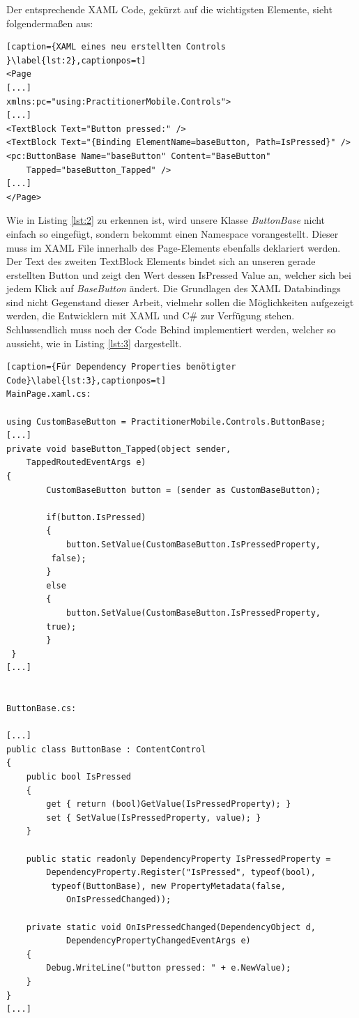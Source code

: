 \documentclass[a4paper,bibtotoc,oneside]{scrbook}
\begin{document}
\newline
Der entsprechende XAML Code, gekürzt auf die wichtigsten Elemente, sieht folgendermaßen aus:
\newline
\begin{lstlisting}[caption={XAML eines neu erstellten Controls }\label{lst:2},captionpos=t]
<Page
[...]
xmlns:pc="using:PractitionerMobile.Controls">
[...]
<TextBlock Text="Button pressed:" />
<TextBlock Text="{Binding ElementName=baseButton, Path=IsPressed}" />
<pc:ButtonBase Name="baseButton" Content="BaseButton" 
	Tapped="baseButton_Tapped" />
[...]
</Page>
\end{lstlisting}
Wie in Listing \ref{lst:2} zu erkennen ist, wird unsere Klasse \textit{ButtonBase} nicht einfach so eingefügt, sondern bekommt einen Namespace vorangestellt. Dieser muss im XAML File innerhalb des Page-Elements ebenfalls deklariert werden.
\newline
\newline
Der Text des zweiten TextBlock Elements bindet sich an unseren gerade erstellten Button und zeigt den Wert dessen IsPressed Value an, welcher sich bei jedem Klick auf \textit{BaseButton} ändert. Die Grundlagen des XAML Databindings sind nicht Gegenstand dieser Arbeit, vielmehr sollen die Möglichkeiten aufgezeigt werden, die Entwicklern mit XAML und C\# zur Verfügung stehen.
\newline
\newline
Schlussendlich muss noch der Code Behind implementiert werden, welcher so aussieht, wie in Listing \ref{lst:3} dargestellt.
\begin{lstlisting}[caption={Für Dependency Properties benötigter Code}\label{lst:3},captionpos=t]
MainPage.xaml.cs:

using CustomBaseButton = PractitionerMobile.Controls.ButtonBase;
[...]
private void baseButton_Tapped(object sender,
	TappedRoutedEventArgs e)
{
        CustomBaseButton button = (sender as CustomBaseButton);

        if(button.IsPressed)
        {
            button.SetValue(CustomBaseButton.IsPressedProperty,
		 false);
        }
        else
        {
            button.SetValue(CustomBaseButton.IsPressedProperty, 
		true);
        }
 }
[...]


ButtonBase.cs:

[...]
public class ButtonBase : ContentControl
{
    public bool IsPressed
    {
        get { return (bool)GetValue(IsPressedProperty); }
        set { SetValue(IsPressedProperty, value); }
    }

    public static readonly DependencyProperty IsPressedProperty = 
        DependencyProperty.Register("IsPressed", typeof(bool),
		 typeof(ButtonBase), new PropertyMetadata(false, 
			OnIsPressedChanged));

    private static void OnIsPressedChanged(DependencyObject d, 
			DependencyPropertyChangedEventArgs e)
    {
        Debug.WriteLine("button pressed: " + e.NewValue);
    }
}
[...]
\end{lstlisting}
\end{document}
